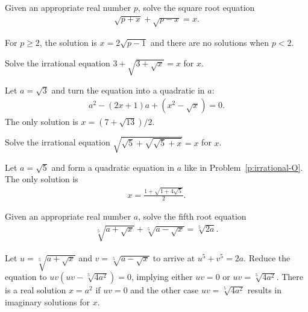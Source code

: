 \documentclass[12pt,a4paper]{memoir}
\theoremstyle{definition}
\begin{document}
\begin{question}\label{p:irrational-N}
	Given an appropriate real number $p$, solve the square root equation
	\begin{align*}
		\sqrt{p+x}+\sqrt{p-x}=x.
	\end{align*}
\end{question}

\begin{solution}
	For $p\geq 2$, the solution is $x=2\sqrt{p-1}$ and there are no solutions when $p<2$.
\end{solution}


\begin{question}\label{p:irrational-O}
	Solve the irrational equation $3+\sqrt{3+\sqrt{x}}=x$ for $x$.
\end{question}

\begin{solution}
	Let $a=\sqrt 3$ and turn the equation into a quadratic in $a$:
	\begin{align*}
		a^2 - (2x+1)a + (x^2-\sqrt x)=0.
	\end{align*}
	The only solution is $x=(7+\sqrt{13})/2$.
\end{solution}


\begin{question}\label{p:irrational-P}
	Solve the irrational equation $\sqrt{\sqrt{5}+\sqrt{\sqrt{5}+x}}=x$ for $x$.
\end{question}

\begin{solution}
	Let $a=\sqrt 5$ and form a quadratic equation in $a$ like in Problem~\ref{p:irrational-O}. The only solution is
	\begin{align*}
		x = \frac{1+\sqrt{1+4\sqrt{5}}}{2}.
	\end{align*}
\end{solution}

\begin{question}\label{p:irrational-Q}
	Given an appropriate real number $a$, solve the fifth root equation
	\begin{align*}
		\sqrt[5]{a+\sqrt{x}}+\sqrt[5]{a-\sqrt{x}}=\sqrt[5]{2a}.
	\end{align*}
\end{question}

\begin{solution}
	Let $u=\sqrt[5]{a+\sqrt{x}}$ and $v=\sqrt[5]{a-\sqrt{x}}$ to arrive at $u^5+v^5=2a$. Reduce the equation to $uv(uv-\sqrt[5]{4a^2})=0$, implying either $uv=0$ or $uv=\sqrt[5]{4a^2}$. There is a real solution $x=a^2$ if $uv=0$ and the other case $uv=\sqrt[5]{4a^2}$ results in imaginary solutions for $x$.
\end{solution}
\end{document}
